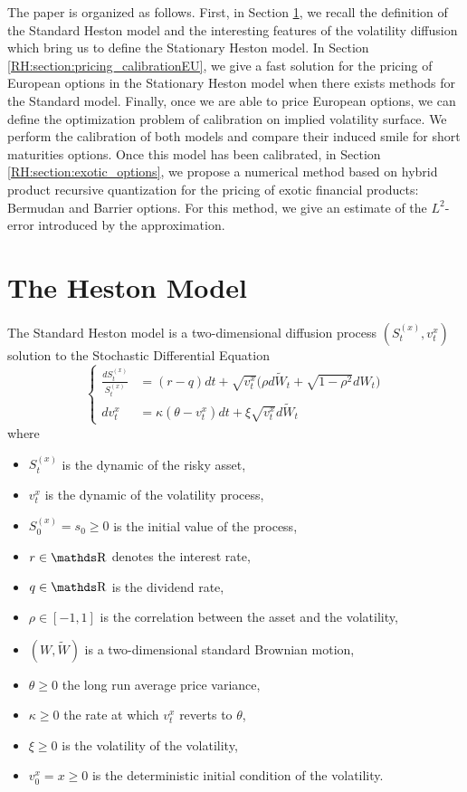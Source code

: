 \medskip

The paper is organized as follows. First, in Section \ref{RH:section:the_model}, we recall the definition of the Standard Heston model and the interesting features of the volatility diffusion which bring us to define the Stationary Heston model. In Section \ref{RH:section:pricing_calibrationEU}, we give a fast solution for the pricing of European options in the Stationary Heston model when there exists methods for the Standard model. Finally, once we are able to price European options, we can define the optimization problem of calibration on implied volatility surface. We perform the calibration of both models and compare their induced smile for short maturities options. Once this model has been calibrated, in Section \ref{RH:section:exotic_options}, we propose a numerical method based on hybrid product recursive quantization for the pricing of exotic financial products: Bermudan and Barrier options. For this method, we give an estimate of the $L^2$-error introduced by the approximation.





\section{The Heston Model} \label{RH:section:the_model}
The Standard Heston model is a two-dimensional diffusion process $(S_t^{(x)}, v_t^x)$ solution to the Stochastic Differential Equation
\begin{equation} \label{RH:model_standard_heston}
	\left\{
	\begin{aligned}
		\frac{dS_t^{(x)}}{S_t^{(x)}} & = (r-q) dt + \sqrt{v_t^x} \big( \rho d \widetilde W_t + \sqrt{1 - \rho^2} d W_t \big) \\
		dv_t^x                       & = \kappa (\theta - v_t^x) dt + \xi \sqrt{v_t^x} d \widetilde W_t
	\end{aligned}
	\right.
\end{equation}
where
\begin{itemize}
	\item $S_t^{(x)}$ is the dynamic of the risky asset,
	\item $v_t^x$ is the dynamic of the volatility process,
	\item $S_0^{(x)} = s_0 \geq 0$ is the initial value of the process,
	\item $r \in \R$ denotes the interest rate,
	\item $q \in \R$ is the dividend rate,
	\item $\rho \in [-1, 1]$ is the correlation between the asset and the volatility,
	\item $(W, \widetilde W)$ is a two-dimensional standard Brownian motion,
	\item $\theta \geq 0$ the long run average price variance,
	\item $\kappa \geq 0$ the rate at which $v_t^x$ reverts to $\theta$,
	\item $\xi \geq 0$ is the volatility of the volatility,
	\item $v_0^x = x \geq 0$ is the deterministic initial condition of the volatility.
\end{itemize}

